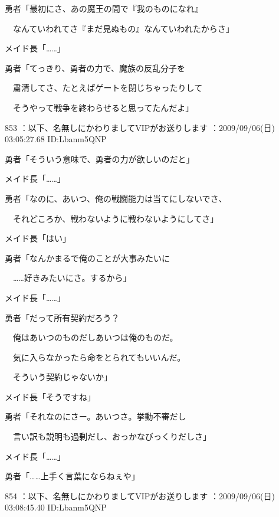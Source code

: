 \documentclass[a4j,twocolumn]{tarticle}
\begin{document}
勇者「最初にさ、あの魔王の間で『我のものになれ』\par{}  
　なんていわれてさ『まだ見ぬもの』なんていわれたからさ」\par{}  
メイド長「……」 



勇者「てっきり、勇者の力で、魔族の反乱分子を\par{}  
　粛清してさ、たとえばゲートを閉じちゃったりして\par{}  
　そうやって戦争を終わらせると思ってたんだよ」 

	
    
    

853 ：以下、名無しにかわりましてVIPがお送りします ：2009/09/06(日) 03:05:27.68 ID:Lbanm5QNP 


勇者「そういう意味で、勇者の力が欲しいのだと」\par{} 
メイド長「……」 



勇者「なのに、あいつ、俺の戦闘能力は当てにしないでさ、\par{} 
　それどころか、戦わないように戦わないようにしてさ」\par{} 
メイド長「はい」 



勇者「なんかまるで俺のことが大事みたいに\par{} 
　……好きみたいにさ。するから」 



メイド長「……」 



勇者「だって所有契約だろう？\par{} 
　俺はあいつのものだしあいつは俺のものだ。\par{} 
　気に入らなかったら命をとられてもいいんだ。\par{} 
　そういう契約じゃないか」 



メイド長「そうですね」 



勇者「それなのにさー。あいつさ。挙動不審だし\par{} 
　言い訳も説明も過剰だし、おっかなびっくりだしさ」 



メイド長「……」 



勇者「……上手く言葉にならねぇや」 

	
    
    

854 ：以下、名無しにかわりましてVIPがお送りします ：2009/09/06(日) 03:08:45.40 ID:Lbanm5QNP 
\end{document}

